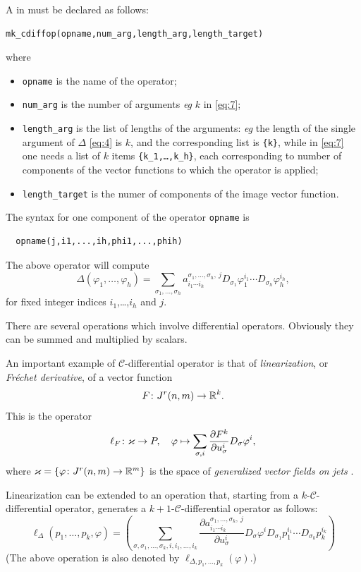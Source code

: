 A \cdiffop in \cde must be declared as follows:
\hypertarget{operator:MK_CDIFFOP}{}
\begin{verbatim}
mk_cdiffop(opname,num_arg,length_arg,length_target)
\end{verbatim}
where
\begin{itemize}
\item \texttt{opname} is the name of the operator;
\item \texttt{num\_arg} is the number of arguments \emph{eg} $k$ in
  \eqref{eq:7};
\item \texttt{length\_arg} is the list of lengths of the arguments: \emph{eg}
  the length of the single argument of $\Delta$ \eqref{eq:4} is $k$, and the
  corresponding list is \texttt{\{k\}}, while in \eqref{eq:7} one needs a list
  of $k$ items \texttt{\{k\_1,\dots,k\_h\}}, each corresponding to number of
  components of the vector functions to which the operator is applied;
\item \texttt{length\_target} is the numer of components of the image vector
  function.
\end{itemize}
The syntax for one component of the operator \texttt{opname} is
\begin{verbatim}
  opname(j,i1,...,ih,phi1,...,phih)
\end{verbatim}
The above operator will compute
\begin{equation}
  \label{eq:10}
  \Delta(\varphi_1,\dots,\varphi_h) = \sum_{\sigma_1,\ldots,\sigma_h}
  a^{\sigma_1,\ldots,\sigma_h,\ j}_{i_1\cdots i_h}
  D_{\sigma_1} \varphi_1^{i_1}\cdots D_{\sigma_h}\varphi_h^{i_h},
\end{equation}
for fixed integer indices $i_1$,\dots,$i_h$ and $j$.

\medskip

There are several operations which involve differential operators. Obviously
they can be summed and multiplied by scalars.

An important example of $\mathcal{C}$-differential operator is that of
\emph{linearization}, or \emph{Fr\'echet derivative}, of a vector function
\[
    F\colon J^r(n,m) \to \mathbb{R}^k.
\]
This is the operator
\[
  \ell_F\colon \varkappa \to P ,\quad \varphi \mapsto
  \sum_{\sigma, i}\pd{F^k}{u^i_\sigma}D_\sigma\varphi^i,
\]
where $\varkappa = \{ \varphi \colon J^r(n,m) \to \mathbb{R}^m \}$ is the space of
\emph{generalized vector fields on jets} \cite{Krasilshchik:99,Olver:93}.

Linearization can be extended to an operation that, starting from a
$k$-$\mathcal{C}$-differential operator, generates a
$k+1$-$\mathcal{C}$-differential operator as follows:
\[
  \ell_{\Delta}(p_1,\dots,p_k,\varphi) =
  (\sum_{\sigma,\sigma_1,\ldots,\sigma_k, i,i_1,\ldots,i_k}
  \frac{\partial a^{\sigma_1,\ldots,\sigma_k,\ j}_{i_1\cdots i_k}}{\partial
    u^i_\sigma}
  D_{\sigma}\varphi^i D_{\sigma_1}p_1^{i_1}\cdots D_{\sigma_k}p_k^{i_k})
\]
(The above operation is also denoted by $\ell_{\Delta,p_1,\dots,p_k}(\varphi)$.)

